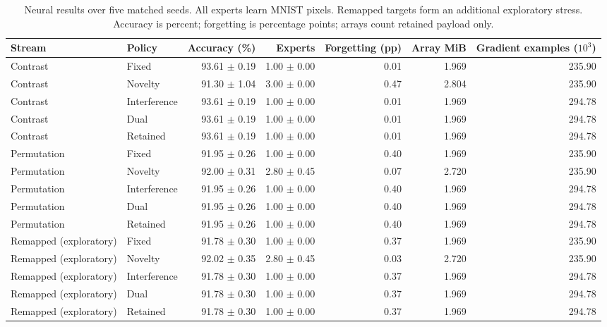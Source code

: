 \begin{table}[t]
\caption{Neural results over five matched seeds. All experts learn MNIST pixels. Remapped targets form an additional exploratory stress. Accuracy is percent; forgetting is percentage points; arrays count retained payload only.}
\label{tab:neural}
\centering\small
\begin{tabular}{llrrrrr}\toprule Stream & Policy & Accuracy (\%) & Experts & Forgetting (pp) & Array MiB & Gradient examples ($10^3$)\\\midrule
Contrast & Fixed & 93.61 $\pm$ 0.19 & 1.00 $\pm$ 0.00 & 0.01 & 1.969 & 235.90 \\
Contrast & Novelty & 91.30 $\pm$ 1.04 & 3.00 $\pm$ 0.00 & 0.47 & 2.804 & 235.90 \\
Contrast & Interference & 93.61 $\pm$ 0.19 & 1.00 $\pm$ 0.00 & 0.01 & 1.969 & 294.78 \\
Contrast & Dual & 93.61 $\pm$ 0.19 & 1.00 $\pm$ 0.00 & 0.01 & 1.969 & 294.78 \\
Contrast & Retained & 93.61 $\pm$ 0.19 & 1.00 $\pm$ 0.00 & 0.01 & 1.969 & 294.78 \\
\midrule
Permutation & Fixed & 91.95 $\pm$ 0.26 & 1.00 $\pm$ 0.00 & 0.40 & 1.969 & 235.90 \\
Permutation & Novelty & 92.00 $\pm$ 0.31 & 2.80 $\pm$ 0.45 & 0.07 & 2.720 & 235.90 \\
Permutation & Interference & 91.95 $\pm$ 0.26 & 1.00 $\pm$ 0.00 & 0.40 & 1.969 & 294.78 \\
Permutation & Dual & 91.95 $\pm$ 0.26 & 1.00 $\pm$ 0.00 & 0.40 & 1.969 & 294.78 \\
Permutation & Retained & 91.95 $\pm$ 0.26 & 1.00 $\pm$ 0.00 & 0.40 & 1.969 & 294.78 \\
\midrule
Remapped (exploratory) & Fixed & 91.78 $\pm$ 0.30 & 1.00 $\pm$ 0.00 & 0.37 & 1.969 & 235.90 \\
Remapped (exploratory) & Novelty & 92.02 $\pm$ 0.35 & 2.80 $\pm$ 0.45 & 0.03 & 2.720 & 235.90 \\
Remapped (exploratory) & Interference & 91.78 $\pm$ 0.30 & 1.00 $\pm$ 0.00 & 0.37 & 1.969 & 294.78 \\
Remapped (exploratory) & Dual & 91.78 $\pm$ 0.30 & 1.00 $\pm$ 0.00 & 0.37 & 1.969 & 294.78 \\
Remapped (exploratory) & Retained & 91.78 $\pm$ 0.30 & 1.00 $\pm$ 0.00 & 0.37 & 1.969 & 294.78 \\
\bottomrule
\end{tabular}
\end{table}

